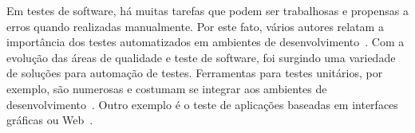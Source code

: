 \documentclass[12pt]{article}
\begin{document}

Em testes de software, há muitas tarefas que podem ser trabalhosas e propensas a erros quando realizadas manualmente. Por este fato, vários autores relatam a importância dos testes automatizados em ambientes de desenvolvimento~\cite{sbqs2013}. Com a evolução das áreas de qualidade e teste de software, foi surgindo uma variedade de soluções para automação de testes. Ferramentas para testes unitários, por exemplo, são numerosas e costumam se integrar aos ambientes de desenvolvimento~\cite{unittesting}. Outro exemplo é o teste de aplicações baseadas em interfaces gráficas ou Web~\cite{webtesting}.


\end{document}
